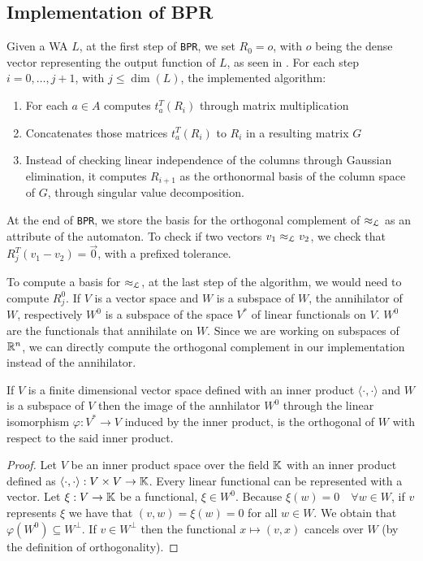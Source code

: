 \subsection{Implementation of BPR}
Given a WA $L$, at the first step of \texttt{BPR}, we set $R_0 = o$, 
with $o$ being the dense vector representing the output function 
of $L$, as seen in \cite{BONCHI201277}.
For each step $i = 0, \hdots, j+1$, with $j \leq \dim(L)$, the implemented algorithm:
\begin{enumerate}
    \item For each $a \in A$ computes $t_a^T(R_i)$ through matrix multiplication
    \item Concatenates those matrices $t_a^T(R_i)$ to $R_i$ in a resulting matrix $G$ 
    \item Instead of checking linear independence of the columns through Gaussian elimination,
    it computes $R_{i+1}$ as the orthonormal basis of the column space of $G$, through singular 
    value decomposition.
\end{enumerate}

At the end of \texttt{BPR}, we store the basis for the orthogonal complement
of $\approx_{\mathcal{L}}$ as an attribute of the automaton. To check if two vectors $v_1 \approx_{\mathcal{L}} v_2$,
we check that $R_j^T(v_1 - v_2) = \vec{0}$, with a prefixed tolerance.


To compute a basis for $\approx_{\mathcal{L}}$, at the last step of the algorithm,
we would need to compute $R_j^0$.
If $V$ is a vector space and $W$ is a
subspace of $W$, the annihilator of $W$, respectively $W^0$ is 
a subspace of the space $V^*$ of linear functionals on $V$.
$W^0$ are the functionals that annihilate on $W$. Since 
we are working on subspaces of $\mathbb{R}^n$, we can directly compute 
the orthogonal complement in our implementation instead of the
annihilator.


\begin{prop}
  If $V$ is a finite dimensional vector space defined with an inner product
  $\langle \cdot , \cdot \rangle$ and $W$ is a subspace of $V$
  then the image of the annhilator $W^0$ through the linear 
  isomorphism $\varphi: V^* \to V$ induced by the inner product, 
  is the orthogonal of $W$ with respect to the said inner product.
\end{prop}

\begin{proof}
  Let $V$ be an inner product space over the field $\mathbb{K}$ with an inner product defined as
  $\langle \cdot , \cdot \rangle : V \times V \to \mathbb{K}$. 
  Every linear functional can be 
  represented with a vector. Let $\xi : V \to \mathbb{K}$ be a functional, 
  $\xi \in  W^0$. Because $\xi(w)=0 \quad \forall  w \in W$, 
  if $v$ represents $\xi$ we have that $(v, w)=\xi(w)=0$ for all $w \in W$. 
  We obtain that $\varphi(W^0) \subseteq W^{\perp}$.
  If $v \in W^\perp$  
  then the functional $x \mapsto (v, x)$ cancels over $W$ 
  (by the definition of orthogonality).
\end{proof}

